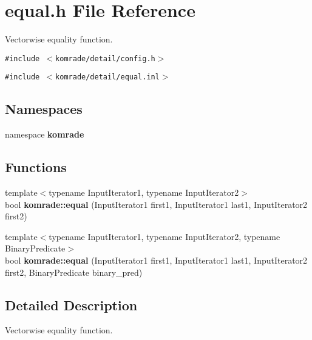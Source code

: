 \section{equal.h File Reference}
\label{equal_8h}
Vectorwise equality function. 

{\tt \#include $<$komrade/detail/config.h$>$}\par
{\tt \#include $<$komrade/detail/equal.inl$>$}\par
\subsection*{Namespaces}
\begin{CompactItemize}
\item 
namespace {\bf komrade}
\end{CompactItemize}
\subsection*{Functions}
\begin{CompactItemize}
\item 
{\footnotesize template$<$typename InputIterator1, typename InputIterator2$>$ }\\bool {\bf komrade::equal} (InputIterator1 first1, InputIterator1 last1, InputIterator2 first2)
\item 
{\footnotesize template$<$typename InputIterator1, typename InputIterator2, typename BinaryPredicate$>$ }\\bool {\bf komrade::equal} (InputIterator1 first1, InputIterator1 last1, InputIterator2 first2, BinaryPredicate binary\_\-pred)
\end{CompactItemize}


\subsection{Detailed Description}
Vectorwise equality function. 

